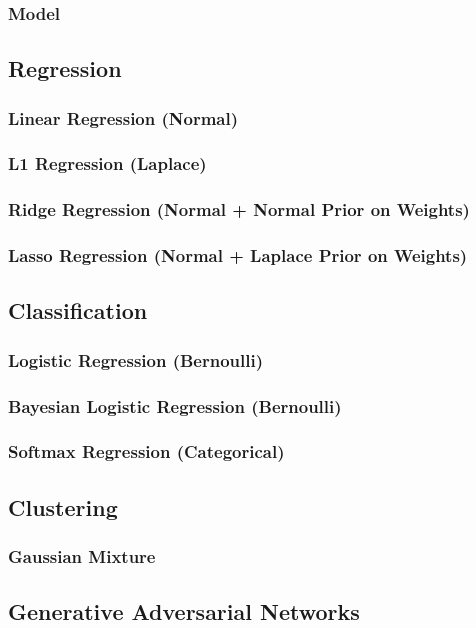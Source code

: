 \documentclass{article}
\begin{document}
\subsubsection{Model}

\subsection{Regression}
\subsubsection{Linear Regression (Normal)}
\subsubsection{L1 Regression (Laplace)}
\subsubsection{Ridge Regression (Normal + Normal Prior on Weights)}
\subsubsection{Lasso Regression (Normal + Laplace Prior on Weights)}

\subsection{Classification}
\subsubsection{Logistic Regression (Bernoulli)}
\subsubsection{Bayesian Logistic Regression (Bernoulli)}
\subsubsection{Softmax Regression (Categorical)}

\subsection{Clustering}
\subsubsection{Gaussian Mixture}

\subsection{Generative Adversarial Networks}
\end{document}
